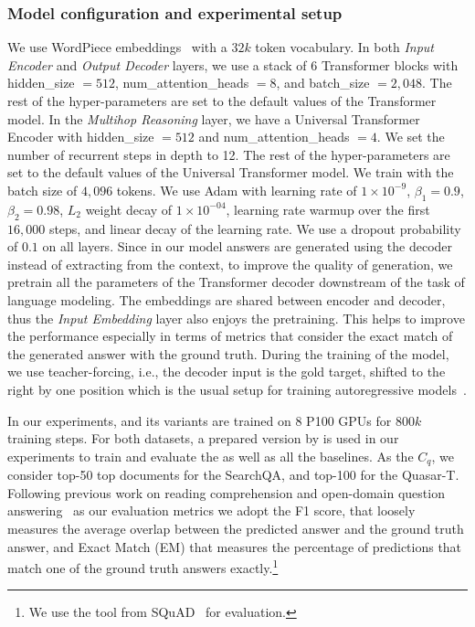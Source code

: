 \subsubsection{Model configuration and experimental setup}
We use WordPiece embeddings~\citep{wu:2016:google} with a $32k$ token vocabulary. 
%
In both \emph{Input Encoder} and \emph{Output Decoder} layers, we use 
a stack of 6 Transformer blocks with hidden\_size $= 512$, num\_attention\_heads $=8$, and batch\_size $=2,048$. 
The rest of the hyper-parameters are set to the default values of the Transformer model.
%
In the \emph{Multihop Reasoning} layer, we have a Universal Transformer Encoder with hidden\_size $=512$ and num\_attention\_heads $=4$. 
We set the number of recurrent steps in depth to 12. The rest of the hyper-parameters are set to the default values of the Universal Transformer model.
%
We train with the batch size of $4,096$ tokens. We use Adam with learning rate of $1\times 10^{-9}$, $\beta_1 = 0.9$, $\beta_2 = 0.98$, $L_2$ weight decay of $1\times 10^{-04}$, learning rate warmup over the first $16,000$ steps, and linear decay of the learning rate. 
We use a dropout probability of $0.1$ on all layers.
%
Since in our model answers are generated using the decoder instead of extracting from the context, to improve the quality of generation, we pretrain all the parameters of the Transformer decoder downstream of the task of language modeling. The embeddings are shared between encoder and decoder, thus the \emph{Input Embedding} layer also enjoys the pretraining. This helps to improve the performance especially in terms of metrics that consider the exact match of the generated answer with the ground truth.
%
During the training of the model, we use teacher-forcing, i.e., the decoder input is the gold target, shifted to the right by one position which is the usual setup for training autoregressive models~\citep{williams1989learning}. 

In our experiments, \tracrnet and its variants are trained on 8 P100 GPUs for $800k$ training steps.
%
For both datasets, a prepared version by \citet{wang2017r} is used in our experiments to train and evaluate the \tracrnet as well as all the baselines. As the $C_q$, we consider top-50 top documents for the SearchQA, and top-100 for the Quasar-T.
%
Following previous work on reading comprehension and open-domain question answering~\citep{shen2017reasonet,buck2017ask,wang2017r,wang2017evidence,lin2018denoising} as our evaluation metrics we adopt the F1 score, that loosely measures the average overlap between the predicted answer and the ground truth answer, and Exact Match (EM) that measures the percentage of predictions that match one of the ground truth answers exactly.\footnote{We use the tool from SQuAD~\citep{rajpurkar2016squad} for evaluation.} 

